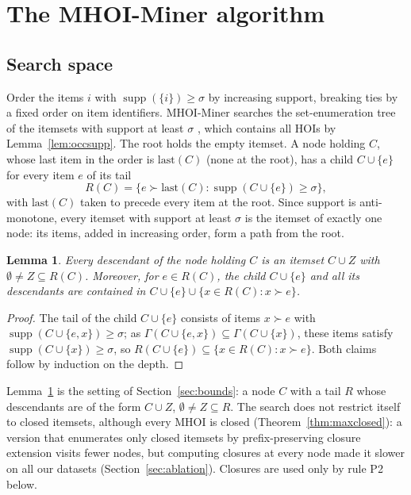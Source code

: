 \documentclass[pdflatex,sn-mathphys,Numbered]{sn-jnl}
\theoremstyle{thmstyleone}
\newtheorem{lemma}[theorem]{Lemma}
\theoremstyle{thmstyletwo}
\theoremstyle{thmstylethree}
\newcommand{\supp}{\operatorname{supp}}
\newcommand{\Algo}{MHOI-Miner}
\begin{document}
\section{The \Algo{} algorithm}\label{sec:algo}

\subsection{Search space}

Order the items $i$ with $\supp(\{i\}) \ge \sigma$ by increasing support, breaking ties by a fixed order on item identifiers. \Algo{} searches the set-enumeration tree of the itemsets with support at least $\sigma$ \cite{bayardo1998maxminer}, which contains all HOIs by Lemma~\ref{lem:occsupp}. The root holds the empty itemset. A node holding $C$, whose last item in the order is $\mathrm{last}(C)$ (none at the root), has a child $C \cup \{e\}$ for every item $e$ of its tail
\[
R(C) = \{ e \succ \mathrm{last}(C) : \supp(C \cup \{e\}) \ge \sigma \},
\]
with $\mathrm{last}(C)$ taken to precede every item at the root. Since support is anti-monotone, every itemset with support at least $\sigma$ is the itemset of exactly one node: its items, added in increasing order, form a path from the root.

\begin{lemma}\label{lem:desc}
Every descendant of the node holding $C$ is an itemset $C \cup Z$ with $\emptyset \neq Z \subseteq R(C)$. Moreover, for $e \in R(C)$, the child $C \cup \{e\}$ and all its descendants are contained in $C \cup \{e\} \cup \{ x \in R(C) : x \succ e \}$.
\end{lemma}
\begin{proof}
The tail of the child $C \cup \{e\}$ consists of items $x \succ e$ with $\supp(C \cup \{e, x\}) \ge \sigma$; as $\Gamma(C \cup \{e,x\}) \subseteq \Gamma(C \cup \{x\})$, these items satisfy $\supp(C \cup \{x\}) \ge \sigma$, so $R(C \cup \{e\}) \subseteq \{ x \in R(C) : x \succ e \}$. Both claims follow by induction on the depth.
\end{proof}

Lemma~\ref{lem:desc} is the setting of Section~\ref{sec:bounds}: a node $C$ with a tail $R$ whose descendants are of the form $C \cup Z$, $\emptyset \neq Z \subseteq R$. The search does not restrict itself to closed itemsets, although every MHOI is closed (Theorem~\ref{thm:maxclosed}): a version that enumerates only closed itemsets by prefix-preserving closure extension \cite{uno2004lcm} visits fewer nodes, but computing closures at every node made it slower on all our datasets (Section~\ref{sec:ablation}). Closures are used only by rule P2 below.
\end{document}
